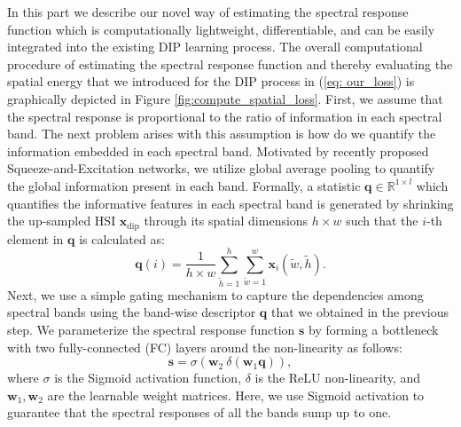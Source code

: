 \documentclass[journal]{IEEEtran}
\begin{document}
    \par In this part we describe our novel way of estimating the spectral response function which is computationally lightweight, differentiable, and can be easily integrated into the existing DIP learning process. The overall computational procedure of estimating the spectral response function and thereby evaluating the spatial energy that we introduced for the DIP process in (\ref{eq: our_loss}) is graphically depicted in Figure \ref{fig:compute_spatial_loss}. First, we assume that the spectral response is proportional to the ratio of information in each spectral band. The next problem arises with this assumption is how do we quantify the information embedded in each spectral band. Motivated by recently proposed Squeeze-and-Excitation networks, we utilize global average pooling to quantify the global information present in each band. Formally, a statistic $\mathbf{q} \in \mathbb{R}^{1 \times l}$  which quantifies the informative features in each spectral band is generated by shrinking the up-sampled HSI $\mathbf{x}_{\text{dip}}$ through its spatial dimensions $h \times w$ such that the $i$-th element in $\mathbf{q}$ is calculated as:
    \begin{equation}
    	\mathbf{q}(i) = \frac{1}{h \times w} \sum_{\tilde{h} = 1}^{h} \sum_{\tilde{w} = 1}^{w} \mathbf{x}_{i}(\tilde{w}, \tilde{h}).
        \label{global_avg_pooling}
    \end{equation}
    Next, we use a simple gating mechanism to capture the dependencies among spectral bands using the band-wise descriptor $\mathbf{q}$ that we obtained in the previous step. We parameterize the spectral response function $\mathbf{s}$ by forming a bottleneck with two fully-connected (FC) layers around the non-linearity as follows:
    \begin{equation}
    	\mathbf{s} = \sigma (\mathbf{w}_2 \: \delta (\mathbf{w}_1 \mathbf{q})),
        \label{gating_mechanism}
    \end{equation}
    where $\sigma$ is the Sigmoid activation function, $\delta$ is the ReLU non-linearity, and $\mathbf{w}_1, \mathbf{w}_2$ are the learnable weight matrices. Here, we use Sigmoid activation to guarantee that the spectral responses of all the bands sump up to one.
    
    
\end{document}
